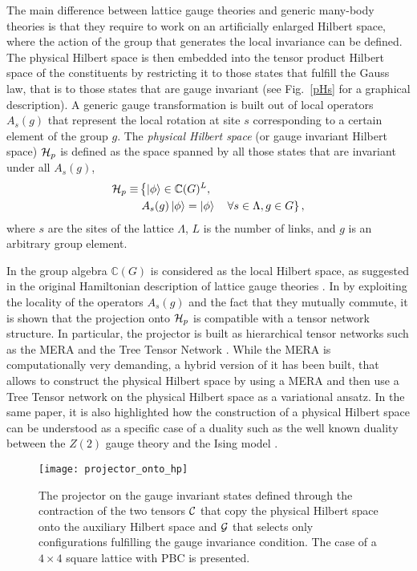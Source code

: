\documentclass[epj,final]{svjour}
\begin{document}
The main difference between lattice gauge theories and generic many-body theories is that they require to work on an artificially enlarged Hilbert space, where the action of the group that generates the local invariance can be defined. The physical Hilbert space \cite{buividovich_entanglement_2008} is then embedded into the tensor product Hilbert space of the constituents by restricting it to those states that fulfill the Gauss law, that is to those states that are gauge invariant (see Fig.~\ref{pHs} for a graphical description). A generic gauge transformation is built out of local operators $A_s(g)$ that represent the local rotation at site $s$ corresponding to a certain element of the group $g$. The \emph{physical Hilbert space} (or gauge invariant Hilbert space) ${\cal H}_p$ is defined as the space spanned by all those states that are invariant under all  $A_s(g)$,   
\begin{align}
{\cal H}_p \equiv & \left\{ \ket{\phi} \in \mathbb{C}(G)^L, \right. \nonumber\\ 
&\left. A_s(g)\ket{\phi} = \ket{\phi} \quad \forall s \in \Lambda, g\in G \right\}, \label{eq:gauge}
\end{align}
where $s$ are the sites of the lattice $\Lambda$, $L$ is the number of links, and $g$ is an arbitrary group element.

In \cite{Tagliacozzo2011} the group algebra $\mathbb{C}(G)$ is considered as the local Hilbert space, as suggested in the original Hamiltonian description of lattice gauge theories \cite{Kogut1975,creutz_gauge_1977}. In \cite{Tagliacozzo2011} by exploiting the locality of  the operators $A_s(g)$ and the fact that they mutually commute, it is shown that the projection onto ${\cal H}_p$ is compatible with a tensor network structure. In particular, the projector is built as hierarchical tensor networks such as the MERA \cite{vidal_entanglement_2007} and the Tree Tensor Network \cite{tagliacozzo_simulation_2009}. While the MERA is computationally very demanding, a hybrid version of it has been built, that allows to construct the physical Hilbert space by using a MERA and then use a Tree Tensor network on the physical Hilbert space as a variational ansatz. In the same paper, it is also highlighted how the construction of a physical Hilbert space can be understood as a specific case of a duality such as the well known duality between the $Z(2)$ gauge theory and the Ising model \cite{savit_duality_1980}. 

\begin{figure}
\begin{center}
\texttt{[image: projector\_onto\_hp]}
\caption{The projector on the gauge invariant states defined through the contraction of the two tensors ${\cal C}$ that copy the physical Hilbert space onto the auxiliary Hilbert space and ${\cal G}$ that selects only configurations fulfilling the gauge invariance condition. The case of a $4\times 4$ square lattice with PBC is presented.}
\label{poh}
\end{center}
\end{figure}
\end{document}
